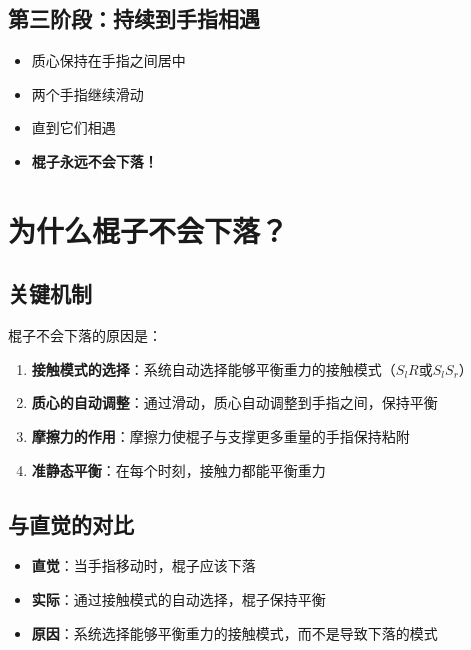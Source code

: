\documentclass[12pt,a4paper]{article}
\begin{document}
\subsection{第三阶段：持续到手指相遇}

\begin{itemize}
    \item 质心保持在手指之间居中
    \item 两个手指继续滑动
    \item 直到它们相遇
    \item \textbf{棍子永远不会下落！}
\end{itemize}

\section{为什么棍子不会下落？}

\subsection{关键机制}

棍子不会下落的原因是：

\begin{enumerate}
    \item \textbf{接触模式的选择}：系统自动选择能够平衡重力的接触模式（$S_lR$或$S_lS_r$）
    
    \item \textbf{质心的自动调整}：通过滑动，质心自动调整到手指之间，保持平衡
    
    \item \textbf{摩擦力的作用}：摩擦力使棍子与支撑更多重量的手指保持粘附
    
    \item \textbf{准静态平衡}：在每个时刻，接触力都能平衡重力
\end{enumerate}

\subsection{与直觉的对比}

\begin{itemize}
    \item \textbf{直觉}：当手指移动时，棍子应该下落
    \item \textbf{实际}：通过接触模式的自动选择，棍子保持平衡
    \item \textbf{原因}：系统选择能够平衡重力的接触模式，而不是导致下落的模式
\end{itemize}
\end{document}
